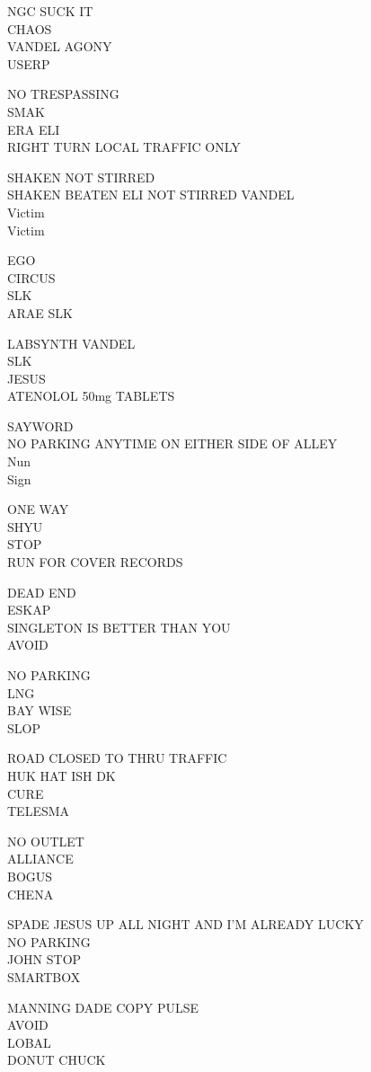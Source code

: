 \documentclass[10pt,letterpaper]{article}
\begin{document}
NGC SUCK IT\\
CHAOS\\
VANDEL AGONY\\
USERP

NO TRESPASSING\\
SMAK\\
ERA ELI\\
RIGHT TURN LOCAL TRAFFIC ONLY

SHAKEN NOT STIRRED\\
SHAKEN BEATEN ELI NOT STIRRED VANDEL\\
Victim\\
Victim

EGO\\
CIRCUS\\
SLK\\
ARAE SLK

LABSYNTH VANDEL\\
SLK\\
JESUS\\
ATENOLOL 50mg TABLETS

SAYWORD\\
NO PARKING ANYTIME ON EITHER SIDE OF ALLEY\\
Nun\\
Sign

ONE WAY\\
SHYU\\
STOP\\
RUN FOR COVER RECORDS

DEAD END\\
ESKAP\\
SINGLETON IS BETTER THAN YOU\\
AVOID

NO PARKING\\
LNG\\
BAY WISE\\
SLOP

ROAD CLOSED TO THRU TRAFFIC\\
HUK HAT ISH DK\\
CURE\\
TELESMA

NO OUTLET\\
ALLIANCE\\
BOGUS\\
CHENA

SPADE JESUS UP ALL NIGHT AND I'M ALREADY LUCKY\\
NO PARKING\\
JOHN STOP\\
SMARTBOX

MANNING DADE COPY PULSE\\
AVOID\\
LOBAL\\
DONUT CHUCK
\end{document}

